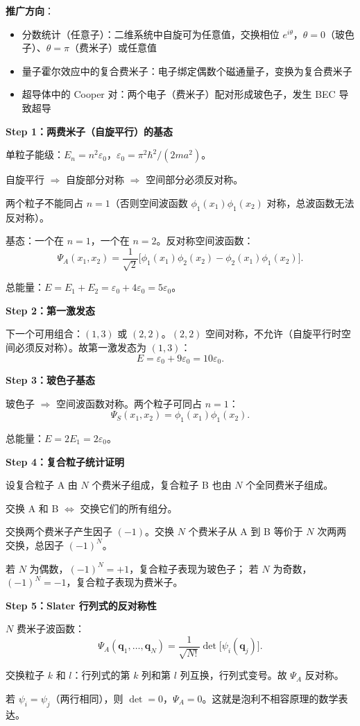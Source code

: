 \begin{insightbox}[物理图像与模型关联]
\textbf{推广方向}：
\begin{itemize}[nosep]
    \item 分数统计（任意子）：二维系统中自旋可为任意值，交换相位 $e^{i\theta}$，$\theta=0$（玻色子）、$\theta=\pi$（费米子）或任意值
    \item 量子霍尔效应中的复合费米子：电子绑定偶数个磁通量子，变换为复合费米子
    \item 超导体中的 Cooper 对：两个电子（费米子）配对形成玻色子，发生 BEC 导致超导
\end{itemize}
\end{insightbox}

\begin{derivationbox}
\textbf{Step 1：两费米子（自旋平行）的基态}

单粒子能级：$E_n=n^2\varepsilon_0$，$\varepsilon_0=\pi^2\hbar^2/(2ma^2)$。

自旋平行 $\Rightarrow$ 自旋部分对称 $\Rightarrow$ 空间部分必须反对称。

两个粒子不能同占 $n=1$（否则空间波函数 $\phi_1(x_1)\phi_1(x_2)$ 对称，总波函数无法反对称）。

基态：一个在 $n=1$，一个在 $n=2$。反对称空间波函数：
\[
\Psi_A(x_1,x_2)=\frac{1}{\sqrt{2}}\bigl[\phi_1(x_1)\phi_2(x_2)-\phi_2(x_1)\phi_1(x_2)\bigr].
\]

总能量：$E=E_1+E_2=\varepsilon_0+4\varepsilon_0=5\varepsilon_0$。

\textbf{Step 2：第一激发态}

下一个可用组合：$(1,3)$ 或 $(2,2)$。$(2,2)$ 空间对称，不允许（自旋平行时空间必须反对称）。故第一激发态为 $(1,3)$：
\[
E=\varepsilon_0+9\varepsilon_0=10\varepsilon_0.
\]

\textbf{Step 3：玻色子基态}

玻色子 $\Rightarrow$ 空间波函数对称。两个粒子可同占 $n=1$：
\[
\Psi_S(x_1,x_2)=\phi_1(x_1)\phi_1(x_2).
\]

总能量：$E=2E_1=2\varepsilon_0$。

\textbf{Step 4：复合粒子统计证明}

设复合粒子 A 由 $N$ 个费米子组成，复合粒子 B 也由 $N$ 个全同费米子组成。

交换 A 和 B $\Leftrightarrow$ 交换它们的所有组分。

交换两个费米子产生因子 $(-1)$。交换 $N$ 个费米子从 A 到 B 等价于 $N$ 次两两交换，总因子 $(-1)^N$。

若 $N$ 为偶数，$(-1)^N=+1$，复合粒子表现为玻色子；
若 $N$ 为奇数，$(-1)^N=-1$，复合粒子表现为费米子。

\textbf{Step 5：Slater 行列式的反对称性}

$N$ 费米子波函数：
\[
\Psi_A(\mathbf{q}_1,\ldots,\mathbf{q}_N)=\frac{1}{\sqrt{N!}}\det\bigl[\psi_i(\mathbf{q}_j)\bigr].
\]

交换粒子 $k$ 和 $l$：行列式的第 $k$ 列和第 $l$ 列互换，行列式变号。故 $\Psi_A$ 反对称。

若 $\psi_i=\psi_j$（两行相同），则 $\det=0$，$\Psi_A=0$。这就是泡利不相容原理的数学表达。
\end{derivationbox}

\vspace{1em}
